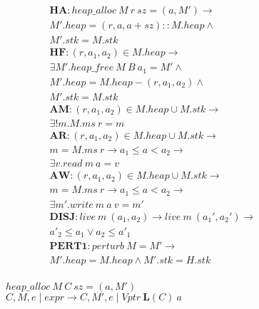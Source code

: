 \documentclass{article}
\begin{document}
\begin{figure}
  \begin{minipage}[t]{0.45\textwidth}
    \[\begin{aligned}
    \mathbf{HA} :
    \mathit{heap\_alloc} ~ M ~ r ~ sz = (a, M') \rightarrow & \\
    M'.heap = (r,a,a+sz)::M.heap \land & \\
    M'.stk = M.stk & \\[0.75em]
    \mathbf{HF} : (r,a_1,a_2) \in M.heap \rightarrow & \\
    \exists M' . \mathit{heap\_free} ~ M ~ B ~ a_1 = M' \land & \\
    M'.heap = M.heap-(r,a_1,a_2) \land & \\
    M'.stk = M.stk & \\[0.75em]
    \mathbf{AM} : (r,a_1,a_2) \in M.heap \cup M.stk \rightarrow & \\
    \exists ! m . M.ms ~ r = m & \\[0.75em]
    \mathbf{AR} : (r,a_1,a_2) \in M.heap \cup M.stk \rightarrow & \\
    m = M.ms ~ r \rightarrow a_1 \leq a < a_2 \rightarrow & \\
    \exists v . \mathit{read} ~ m ~ a = v & \\[0.75em]
    \mathbf{AW} : (r,a_1,a_2) \in M.heap \cup M.stk \rightarrow & \\
    m = M.ms ~ r \rightarrow a_1 \leq a < a_2 \rightarrow & \\
    \exists m' . \mathit{write} ~ m ~ a ~ v = m' & \\[0.75em]
    \mathbf{DISJ} : \mathit{live} ~ m ~ (a_1,a_2) \rightarrow
    \mathit{live} ~ m ~ (a_1',a_2') \rightarrow & \\
    a'_2 \leq a_1 \lor a_2 \leq a'_1 & \\[0.75em]
    \mathbf{PERT1} : \mathit{perturb} ~ M = M' \rightarrow & \\
    M'.heap = M.heap \land M'.stk = H.stk \\[0.75em]
 \end{aligned}\]
  \end{minipage}
  \begin{minipage}[t]{0.65\textwidth}
             {\(\mathit{heap\_alloc} ~ M ~ C ~ sz = (a, M')\)}
             {\(C,M,e\mid \mathit{expr} \longrightarrow
               C,M',e \mid \mathit{Vptr} ~ \mathbf{L}(C) ~ a\)}


\end{minipage}
\end{figure}
\end{document}
